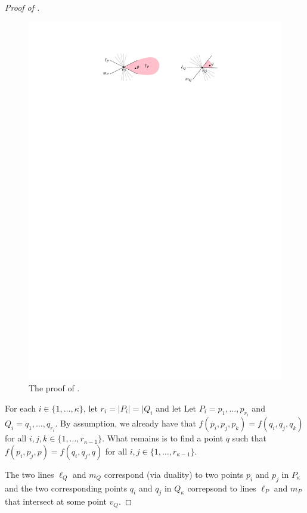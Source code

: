\documentclass{patmorin}
\begin{document}
\begin{enumerate}
\begin{proof}[Proof of ]
   \begin{figure}
      \begin{center}
         \includegraphics{figs/main-lemma}
      \end{center}
      \caption{The proof of .}
   \end{figure}

   For each $i\in \{1,\ldots,\kappa\}$, let $r_i=|P_i|=|Q_i$ and let
   Let $P_{i}=p_1,\ldots,p_{r_i}$ and $Q_{i}=q_1,\ldots,q_{r_i}$.
   By assumption, we already have that $f(p_i,p_j,p_k)=f(q_i,q_j,q_k)$
   for all $i,j,k\in \{1,\ldots,r_{\kappa-1}\}$.  What remains is to
   find a point $q$ such that $f(p_i,p_j,p) = f(q_i,q_j, q)$ for all
   $i,j\in\{1,\ldots,r_{\kappa-1}\}$.

   The two lines $\ell_Q$ and $m_Q$ correspond (via duality) to two
   points $p_i$ and $p_j$ in $P_{\kappa}$ and the two corresponding
   points $q_i$ and $q_j$ in $Q_{\kappa}$ correpsond to lines $\ell_P$
   and $m_P$ that intersect at some point $v_Q$.


\end{proof}
\end{enumerate}
\end{document}
